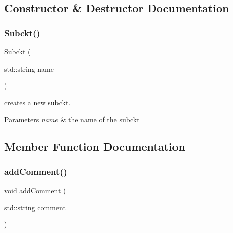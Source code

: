 \subsection{Constructor \& Destructor Documentation}
\mbox{\label{class_s_p_i_c_e_1_1_subckt_a5b9ee31a0302af435029f29a93b29d7d}} 
\subsubsection{\texorpdfstring{Subckt()}{Subckt()}}
{\footnotesize\ttfamily \mbox{\hyperlink{class_s_p_i_c_e_1_1_subckt}{Subckt}} (\begin{DoxyParamCaption}\item[{std\+::string}]{name }\end{DoxyParamCaption})\hspace{0.3cm}{\ttfamily [inline]}}



creates a new subckt. 


\begin{DoxyParams}{Parameters}
{\em name} & the name of the subckt \\
\hline
\end{DoxyParams}


\subsection{Member Function Documentation}
\mbox{\label{class_s_p_i_c_e_1_1_subckt_a6c590c1d92248d6e5f95ea6c470fbb5a}} 
\subsubsection{\texorpdfstring{add\+Comment()}{addComment()}}
{\footnotesize\ttfamily void add\+Comment (\begin{DoxyParamCaption}\item[{std\+::string}]{comment }\end{DoxyParamCaption})\hspace{0.3cm}{\ttfamily [inline]}}



